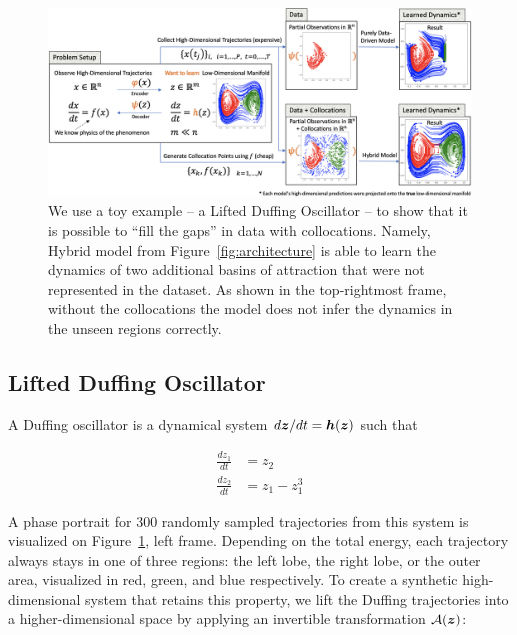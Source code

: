 \begin{figure}[ht]
    \centering
    \includegraphics[width=\textwidth]{figures/duff_first_exp_abstract.png}
    \caption{We use a toy example -- a Lifted Duffing Oscillator -- to show that it is possible to ``fill the gaps'' in data with collocations. Namely, Hybrid model from Figure~\ref{fig:architecture} is able to learn the dynamics of two additional basins of attraction that were not represented in the dataset. As shown in the top-rightmost frame, without the collocations the model does not infer the dynamics in the unseen regions correctly.}
    \label{fig:duffing_pinode}
\end{figure}

\newpage
\subsection{Lifted Duffing Oscillator}
\label{sec:duffing}

A Duffing oscillator is a dynamical system $d\boldsymbol{z}/dt = \boldsymbol{h}(\boldsymbol{z})$ such that 

\begin{equation}
    \label{eq:duffing_definition}
    \begin{split}
    \frac{dz_1}{dt} & = z_2 \\ 
    \frac{dz_2}{dt} & = z_1 - z_1^3
    \end{split}
\end{equation}


A phase portrait for 300 randomly sampled trajectories from this system is visualized on Figure~\ref{fig:duffing_pinode}, left frame. Depending on the total energy, each trajectory always stays in one of three regions: the left lobe, the right lobe, or the outer area, visualized in red, green, and blue respectively. To create a synthetic high-dimensional system that retains this property, we lift the Duffing trajectories into a higher-dimensional space by applying an invertible transformation $\mathcal{A}(\boldsymbol{z})$: 

